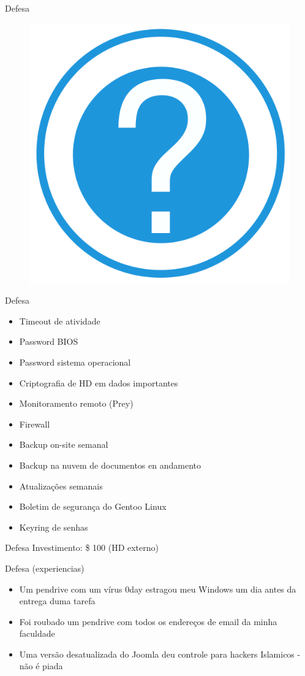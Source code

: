 \documentclass{beamer}
\begin{document}
\begin{frame}{Defesa}
\begin{figure}[tbph]
\centering
\includegraphics[width=0.3\linewidth]{./question}
\label{fig:question2}
\end{figure}
\end{frame}

\begin{frame}{Defesa}
\begin{itemize}
\item Timeout de atividade
\item Password BIOS
\item Password sistema operacional
\item Criptografia de HD em dados importantes
\item Monitoramento remoto (Prey)
\item Firewall
\item Backup on-site semanal
\item Backup na nuvem de documentos en andamento
\item Atualizações semanais
\item Boletim de segurança do Gentoo Linux
\item Keyring de senhas
\end{itemize}
\end{frame}

\begin{frame}{Defesa}
Investimento: \$ 100 (HD externo)
\end{frame}

\begin{frame}{Defesa (experiencias)}
\begin{itemize}
\item Um pendrive com um vírus 0day estragou meu Windows um dia antes da entrega duma tarefa
\item Foi roubado um pendrive com todos os endereços de email da minha faculdade
\item Uma versão desatualizada do Joomla deu controle para hackers Islamicos - não é piada
\end{itemize}
\end{frame}
\end{document}

